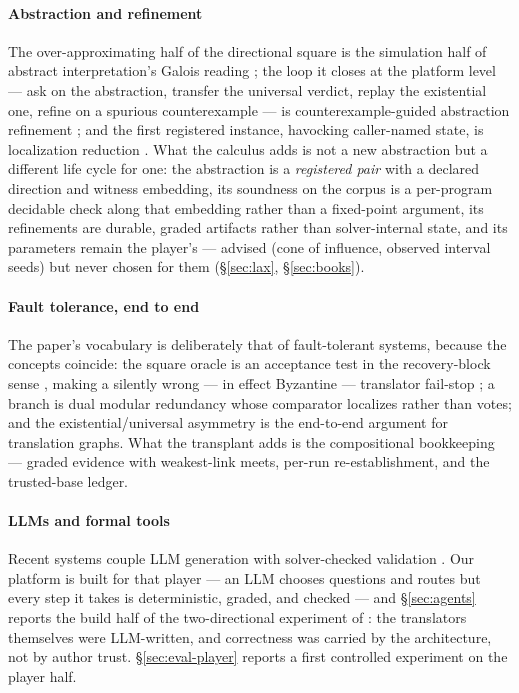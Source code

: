 \ifarxiv
\paragraph{Abstraction and refinement}
The over-approximating half of the directional square is the
simulation half of abstract interpretation's Galois reading
\citep{cousot1977abstract}; the loop it closes at the platform level
--- ask on the abstraction, transfer the universal verdict, replay the
existential one, refine on a spurious counterexample --- is
counterexample-guided abstraction refinement \citep{clarke2000cegar};
and the first registered instance, havocking caller-named state, is
localization reduction \citep{kurshan1994computer}. What the calculus
adds is not a new abstraction but a different life cycle for one: the
abstraction is a \emph{registered pair} with a declared direction and
witness embedding, its soundness on the corpus is a per-program
decidable check along that embedding rather than a fixed-point
argument, its refinements are durable, graded artifacts rather than
solver-internal state, and its parameters remain the player's ---
advised (cone of influence, observed interval seeds) but never chosen
for them (\S\ref{sec:lax}, \S\ref{sec:books}).
\fi

\paragraph{Fault tolerance, end to end}
The paper's vocabulary is deliberately that of fault-tolerant systems,
because the concepts coincide: the square oracle is an acceptance test
in the recovery-block sense \citep{randell1975recovery}, making a
silently wrong --- in effect Byzantine --- translator fail-stop
\citep{schlichting1983failstop}; a branch is dual modular redundancy
whose comparator localizes rather than votes; and the
existential/universal asymmetry is the end-to-end argument
\citep{saltzer1984endtoend} for translation graphs. What the
transplant adds is the compositional bookkeeping --- graded evidence
with weakest-link meets, per-run re-establishment, and the trusted-base
ledger.

\paragraph{LLMs and formal tools}
Recent systems couple LLM generation with solver-checked validation
\citep{sun2024clover}. Our platform is built for that player --- an LLM
chooses questions and routes but every step it takes is deterministic,
graded, and checked --- and \S\ref{sec:agents} reports the build half
of the two-directional experiment of : the translators
themselves were LLM-written, and correctness was carried by the
architecture, not by author trust. \S\ref{sec:eval-player} reports a
first controlled experiment on the player half.

